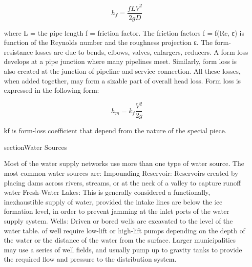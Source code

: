 \begin{equation}
    h_{f}=\frac{fLV^{2}}{2gD}
\end{equation}

where L = the pipe length
f = friction factor.
The friction factors f = f(Re, ε) is function of the Reynolds number and the roughness projection ε.
The form-resistance losses are due to bends, elbows, valves, enlargers, reducers. A form loss 
develops at a pipe junction where many pipelines meet. Similarly, form loss is also created at 
the junction of pipeline and service connection. All these losses, when added together, may form
a sizable part of overall head loss.
Form loss is expressed in the following form:


\begin{equation}
    h_{m}=k_{f}\frac{V^2}{2g}
\end{equation}

kf  is form-loss coefficient that depend from the nature of the special piece.

section{Water Sources}

Most of the water supply networks use more than one type of water source. The most common water 
sources are: 
\bigbreak
Impounding Reservoir: Reservoirs created by placing dams across rivers, streams, 
or at the neck of a valley to capture runoff water 
\bigbreak
Fresh-Water Lakes: This is generally considered a functionally, inexhaustible supply of water,
provided the intake lines are below the ice formation level, in order to prevent jamming at the 
inlet ports of the water supply system.
\bigbreak
Wells: Driven or bored wells are excavated to the level of the water table. of well require 
low-lift or high-lift pumps depending on the depth of the water or the distance of the water 
from the surface. Larger municipalities may use a series of well fields, and usually pump up to 
gravity tanks to provide the required flow and pressure to the distribution system.

